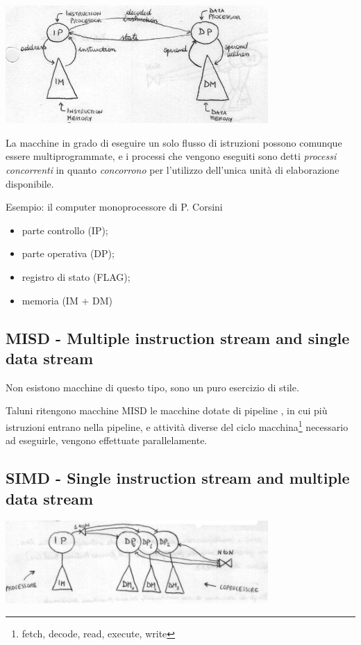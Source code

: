 \documentclass[12pt,a4paper]{article}
\begin{document}
\centerline{\includegraphics[width=10cm]{img/flynn/sisd.png}}

La macchine in grado di eseguire un solo flusso di istruzioni possono
comunque essere multiprogrammate, e i processi che vengono eseguiti sono
detti \emph{processi concorrenti} in quanto \emph{concorrono} per l'utilizzo
dell'unica unità di elaborazione disponibile.

Esempio: il computer monoprocessore di P. Corsini
\begin{itemize}
  \item parte controllo (IP);
  \item parte operativa (DP);
  \item registro di stato (FLAG);
  \item memoria (IM + DM)
\end{itemize}

\subsection{MISD - Multiple instruction stream and single data stream}

Non esistono macchine di questo tipo, sono un puro esercizio di stile.

Taluni ritengono macchine MISD le macchine dotate di
pipeline \cite[209]{frosini:architetturacalcolatori},
in cui più istruzioni entrano nella pipeline,
e attività diverse del ciclo macchina\footnote{fetch, decode, read, execute, write}
necessario ad eseguirle, vengono effettuate parallelamente.

\subsection{SIMD - Single instruction stream and multiple data stream}

\centerline{\includegraphics[width=10cm]{img/flynn/simd.png}}
\end{document}
